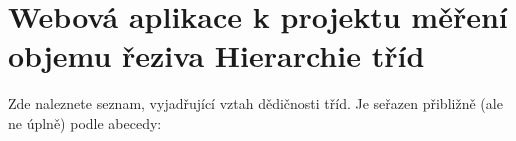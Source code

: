 \section{Webová aplikace k projektu měření objemu řeziva Hierarchie tříd}
Zde naleznete seznam, vyjadřující vztah dědičnosti tříd. Je seřazen přibližně (ale ne úplně) podle abecedy:\begin{CompactList}
\item {}
\item {}
\item {}
\begin{CompactList}
\item {}
\end{CompactList}
\end{CompactList}
